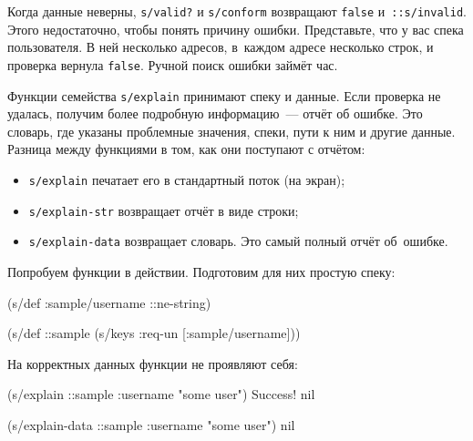 Когда данные неверны, \verb|s/valid?| и \verb|s/conform| возвращают \verb|false|
и~\verb|::s/invalid|. Этого недостаточно, чтобы понять причину
ошибки. Представьте, что у вас спека пользователя. В ней несколько адресов,
в~каждом адресе несколько строк, и проверка вернула \verb|false|. Ручной поиск
ошибки займёт час.

Функции семейства \verb|s/explain| принимают спеку и данные. Если проверка не
удалась, получим более подробную информацию~--- отчёт об ошибке. Это словарь,
где указаны проблемные значения, спеки, пути к ним и другие данные. Разница
между функциями в том, как они поступают с отчётом:

\begin{itemize}


\item
  \verb|s/explain| печатает его в стандартный поток (на экран);

\item
  \verb|s/explain-str| возвращает отчёт в виде строки;

\item
  \verb|s/explain-data| возвращает словарь. Это самый полный отчёт об~ошибке.

\end{itemize}

Попробуем функции в действии. Подготовим для них простую спеку:

\begin{english}
  \begin{clojure}
(s/def :sample/username ::ne-string)

(s/def ::sample
  (s/keys :req-un [:sample/username]))
  \end{clojure}
\end{english}

\noindent
На корректных данных функции не проявляют себя:

\ifx\DEVICETYPE\MOBILE

\begin{english}
  \begin{clojure}
(s/explain ::sample
  {:username "some user"})
Success!
nil

(s/explain-data ::sample
  {:username "some user"})
nil
  \end{clojure}
\end{english}

\else

